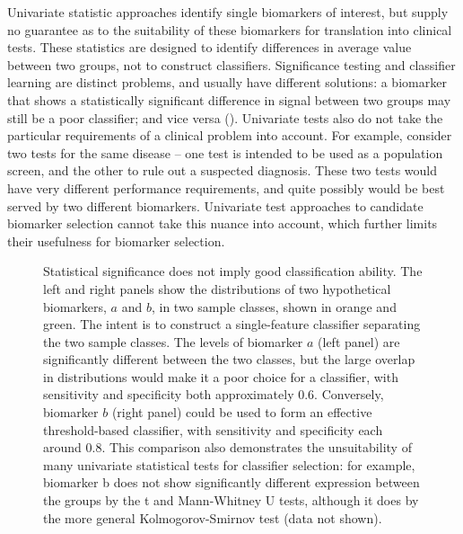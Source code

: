 \documentclass[dissertation.tex]{subfiles}
\begin{document}
Univariate statistic approaches identify single biomarkers of interest, but supply no guarantee as to the suitability of these biomarkers for translation into clinical tests.  These statistics are designed to identify differences in average value between two groups, not to construct classifiers.  Significance testing and classifier learning are distinct problems, and usually have different solutions: a biomarker that shows a statistically significant difference in signal between two groups may still be a poor classifier; and vice versa ().  Univariate tests also do not take the particular requirements of a clinical problem into account.  For example, consider two tests for the same disease -- one test is intended to be used as a population screen, and the other to rule out a suspected diagnosis.  These two tests would have very different performance requirements, and quite possibly would be best served by two different biomarkers.  Univariate test approaches to candidate biomarker selection cannot take this nuance into account, which further limits their usefulness for biomarker selection.

\begin{figure}[!htbp]
  \centering
  \vspace{1cm}
  \hspace{1cm}
  \caption[Statistical significance does not imply good classification ability]{Statistical significance does not imply good classification ability.  The left and right panels show the distributions of two hypothetical biomarkers, $a$ and $b$, in two sample classes, shown in orange and green.  The intent is to construct a single-feature classifier separating the two sample classes.  The levels of biomarker $a$ (left panel) are significantly different between the two classes, but the large overlap in distributions would make it a poor choice for a classifier, with sensitivity and specificity both approximately $0.6$.  Conversely, biomarker $b$ (right panel) could be used to form an effective threshold-based classifier, with sensitivity and specificity each around $0.8$.  This comparison also demonstrates the unsuitability of many univariate statistical tests for classifier selection: for example, biomarker b does not show significantly different expression between the groups by the t and Mann-Whitney U tests, although it does by the more general Kolmogorov-Smirnov test (data not shown).}
\label{fig:messina-example-stats-class}
\end{figure}
\end{document}
